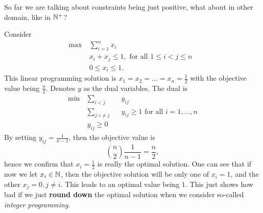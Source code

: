 \hr
So far we are talking about constraints being just positive, what about in other domain, like in \(\mathbb{\MakeUppercase{N}}^+\)?

Consider
\begin{align*}
	\max~ & \sum\limits_{i=1}^{n} x_{i}                              \\
	      & x_{i}+x_{j}\leq 1, \text{ for all \(1\leq i< j\leq n\) } \\
	      & 0\leq x_{i}\leq 1.
\end{align*}
This linear programming solution is \(x_1 = x_2 = \ldots  = x_n = \frac{1}{2}\) with the objective value being \(\frac{n}{2}\).
Denotes \(y\) as the dual variables. The dual is
\[
	\begin{alignedat}{3}
		\min~ & \sum\limits_{i<j}            && y_{ij}                                             \\
		& \sum\limits_{j\colon i\neq j} && y_{ij}\geq 1 \text{ for all \(i = 1, \ldots , n\)} \\
		& y_{ij}\geq 0
	\end{alignedat}
\]
By setting \(y_{ij} = \frac{1}{n-1}\), then the objective value is
\[
	\binom{n}{2}\frac{1}{n-1} = \frac{n}{2},
\]
hence we confirm that \(x_{i} = \frac{1}{2}\) is really the optimal solution. One can see that if now we let \(x_{i}\in\mathbb{\MakeUppercase{N}}\), then
the objective solution will be only one of \(x_{i} = 1\), and the other \(x_{j} = 0, j\neq i\). This leads to an optimal value being
\(1\). This just shows how bad if we just \textbf{round down} the optimal solution when we consider so-called \emph{integer programming}.